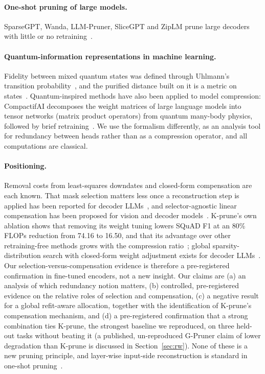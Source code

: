 \documentclass[11pt]{article}
\begin{document}
\paragraph{One-shot pruning of large models.} SparseGPT, Wanda, LLM-Pruner, SliceGPT and ZipLM prune large decoders with
little or no retraining~\citep{frantar2023sparsegpt,sun2024wanda,ma2023llmpruner,ashkboos2024slicegpt,kurtic2023ziplm}.
\paragraph{Quantum-information representations in machine learning.} Fidelity between mixed quantum states was defined
through Uhlmann's transition probability~\citep{uhlmann1976transition,jozsa1994fidelity}, and the purified distance built on
it is a metric on states~\citep{tomamichel2010duality}. Quantum-inspired methods have also been applied to model compression:
CompactifAI decomposes the weight matrices of large language models into tensor networks (matrix product operators) from
quantum many-body physics, followed by brief retraining~\citep{tomut2025compactifai}. We use the formalism differently, as an
analysis tool for redundancy between heads rather than as a compression operator, and all computations are classical.
\paragraph{Positioning.} Removal costs from least-squares downdates and closed-form compensation are each known. That mask
selection matters less once a reconstruction step is applied has been reported for decoder LLMs~\citep{wagner2025freelunch}, and
selector-agnostic linear compensation has been proposed for vision and decoder models~\citep{tang2026grail}. K-prune's own
ablation shows that removing its weight tuning lowers SQuAD F1 at an 80\% FLOPs reduction from 74.16 to 16.50, and that its
advantage over other retraining-free methods grows with the compression ratio~\citep{park2024kprune}; global sparsity-distribution
search with closed-form weight adjustment exists for decoder LLMs~\citep{li2025tyr}. Our selection-versus-compensation evidence is
therefore a pre-registered confirmation in fine-tuned encoders, not a new insight. Our
claims are (a) an analysis of which redundancy notion matters, (b) controlled, pre-registered evidence on the relative
roles of selection and compensation, (c) a negative result for a global refit-aware allocation, together with the identification of K-prune's
compensation mechanism, and (d) a pre-registered confirmation that a strong combination ties K-prune, the strongest baseline we reproduced, on three held-out tasks without beating it (a published, un-reproduced G-Pruner claim of lower degradation than K-prune is discussed in Section~\ref{sec:rw}).
None of these is a new pruning principle, and layer-wise input-side reconstruction is standard in one-shot pruning~\citep{frantar2023sparsegpt,zhang2026corp,he2025olica,wang2024liar}.
\end{document}
